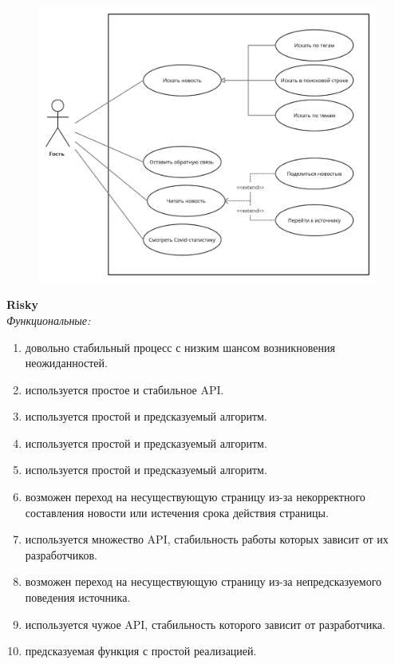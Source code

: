 \begin{center}
    \begin{figure}[H]
        \centering
        \includegraphics[scale=0.18]{img/Untitled Workspace-6}
    \end{figure}
\end{center}
\newpage
\BgThispage
\LARGE
\textbf{Risky}\\
\normalsize
\vspace{0.5cm}
\textit{Функциональные:}
\begin{enumerate}[noitemsep,topsep=0pt,parsep=0pt,partopsep=0pt]
    \item довольно стабильный процесс с низким шансом возникновения неожиданностей.
    \item используется простое и стабильное API.
    \item используется простой и предсказуемый алгоритм.
    \item используется простой и предсказуемый алгоритм.
    \item используется простой и предсказуемый алгоритм.
    \item возможен переход на несуществующую страницу из-за некорректного составления новости или истечения срока действия страницы.
    \item используется множество API, стабильность работы которых зависит от их разработчиков.
    \item возможен переход на несуществующую страницу из-за непредсказуемого поведения источника.
    \item используется чужое API, стабильность которого зависит от разработчика.
    \item предсказуемая функция с простой реализацией.
\end{enumerate}
